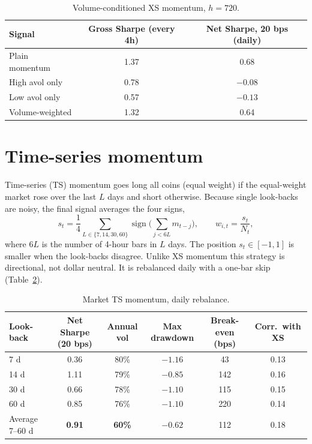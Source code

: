 \documentclass[aps,prl,onecolumn,superscriptaddress,nofootinbib]{revtex4-2}
\begin{document}
	\begin{table}[!htbp]
		\caption{Volume-conditioned XS momentum, $h = 720$.}
		\label{tab:volume}
		\begin{ruledtabular}
			\begin{tabular}{lcc}
				Signal & Gross Sharpe (every 4h) & Net Sharpe, 20 bps (daily) \\
				\hline
				Plain momentum   & 1.37 & 0.68 \\
				High avol only   & 0.78 & $-0.08$ \\
				Low avol only    & 0.57 & $-0.13$ \\
				Volume-weighted  & 1.32 & 0.64 \\
			\end{tabular}
		\end{ruledtabular}
	\end{table}
	
	\section{Time-series momentum}
	\label{app:ts}
	
	Time-series (TS) momentum goes long all coins (equal weight) if the equal-weight market rose over the last $L$ days and short otherwise. Because single look-backs are noisy, the final signal averages the four signs,
	\begin{equation}
		s_t = \frac14 \sum_{L \in \{7,14,30,60\}} \operatorname{sign}\!\Big(\sum_{j<6L} m_{t-j}\Big), \qquad
		w_{i,t} = \frac{s_t}{N_t},
		\label{eq:ts}
	\end{equation}
	where $6L$ is the number of 4-hour bars in $L$ days. The position $s_t \in [-1, 1]$ is smaller when the look-backs disagree. Unlike XS momentum this strategy is directional, not dollar neutral. It is rebalanced daily with a one-bar skip (Table~\ref{tab:ts}).
	
	\begin{table}[!htbp]
		\caption{Market TS momentum, daily rebalance.}
		\label{tab:ts}
		\begin{ruledtabular}
			\begin{tabular}{lccccc}
				Look-back & Net Sharpe (20 bps) & Annual vol & Max drawdown & Break-even (bps) & Corr.\ with XS \\
				\hline
				7 d   & 0.36 & 80\% & $-1.16$ & 43  & 0.13 \\
				14 d  & 1.11 & 79\% & $-0.85$ & 142 & 0.16 \\
				30 d  & 0.66 & 78\% & $-1.10$ & 115 & 0.15 \\
				60 d  & 0.85 & 76\% & $-1.10$ & 220 & 0.14 \\
				Average 7--60 d & \textbf{0.91} & \textbf{60\%} & $\mathbf{-0.62}$ & 112 & 0.18 \\
			\end{tabular}
		\end{ruledtabular}
	\end{table}
	
\end{document}
